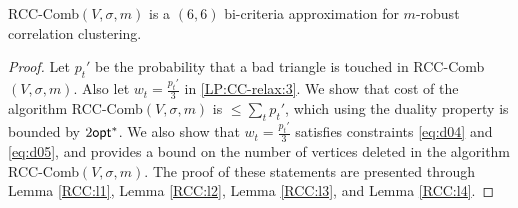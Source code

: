 \begin{algorithm}
\caption{{\sf RCC-Comb}$(V,\sigma,m)$}
\label{RCC-Comb}
\end{algorithm}

\begin{theorem} \label{theorem:rcc-comb}
{\sf RCC-Comb}$(V,\sigma,m)$ is a $(6,6)$ bi-criteria approximation for $m$-robust correlation clustering.
\end{theorem}
\begin{proof}
Let $p_t'$ be the probability that a bad triangle is touched in {\sf RCC-Comb}$(V,\sigma,m)$. Also let $w_t = \frac{p_t'}{3}$ in \ref{LP:CC-relax:3}. We show that cost of the algorithm {\sf RCC-Comb}$(V,\sigma,m)$ is $\leq \sum_t p_t'$, which using the duality property is bounded by $2\mathsf{opt}^*$. We also show that $w_t = \frac{p_t'}{3}$ satisfies constraints \eqref{eq:d04} and \eqref{eq:d05}, and provides a bound on the number of vertices deleted in the algorithm {\sf RCC-Comb}$(V,\sigma,m)$. The proof of these statements are presented through Lemma \ref{RCC:l1}, Lemma \ref{RCC:l2}, Lemma \ref{RCC:l3}, and Lemma \ref{RCC:l4}.
\end{proof}


